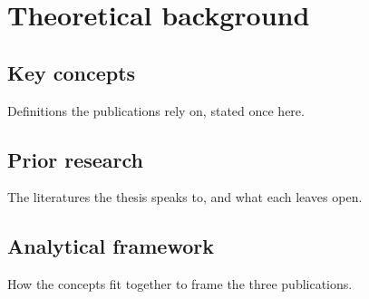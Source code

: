 \chapter{Theoretical background}\label{ch:background}

\section{Key concepts}

Definitions the publications rely on, stated once here.

\section{Prior research}

The literatures the thesis speaks to, and what each leaves open.

\section{Analytical framework}

How the concepts fit together to frame the three publications.
